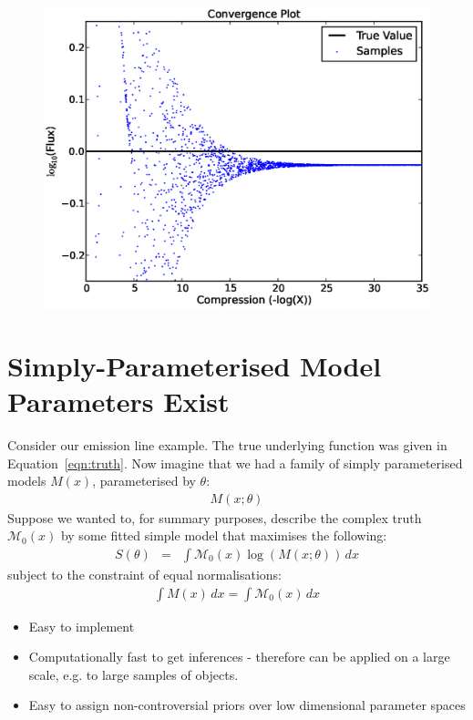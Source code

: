 \documentclass[letterpaper, 11pt]{article}
\begin{document}
\begin{figure}
\begin{center}
\includegraphics[scale=0.5]{convergence.eps}
\caption{\label{convergence}}
\end{center}
\end{figure}

\section{Simply-Parameterised Model Parameters Exist}
Consider our emission line example. The true underlying function was given
in Equation~\ref{eqn:truth}. Now imagine that we had a family of simply
parameterised models $M(x)$, parameterised by $\theta$:
\begin{eqnarray}
M(x; \theta)
\end{eqnarray}
Suppose we wanted to, for summary purposes, describe the complex truth
$\mathcal{M}_0(x)$ by some fitted simple model that maximises the following:
\begin{eqnarray}
S(\theta) &=& \int \mathcal{M}_0(x)\log\left(M(x; \theta)\right) \, dx
\end{eqnarray}
subject to the constraint of equal normalisations:
\begin{eqnarray}
\int M(x) \, dx = \int \mathcal{M}_0(x) \, dx
\end{eqnarray}

\begin{itemize}
\item Easy to implement \\
\item Computationally fast to get inferences - therefore can be applied on a large scale, e.g. to large samples of objects. \\
\item Easy to assign non-controversial priors over low dimensional parameter spaces \\
\end{itemize}
\end{document}
